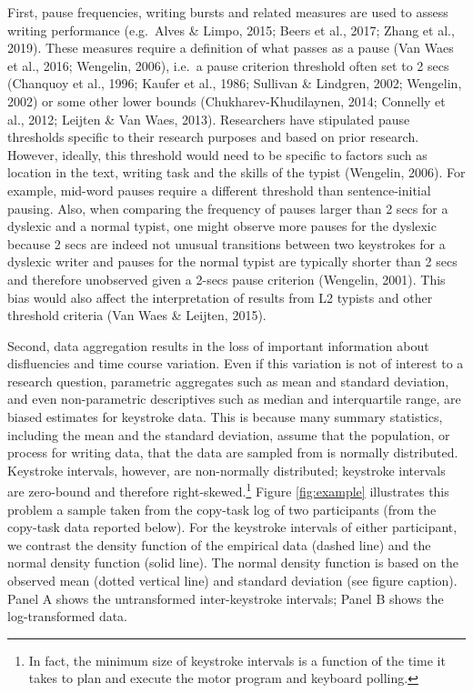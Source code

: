 \documentclass[
  english,
  man,mask,floatsintext]{apa7}
\begin{document}
First, pause frequencies, writing bursts and related measures are used to assess writing performance (e.g.~Alves \& Limpo, 2015; Beers et al., 2017; Zhang et al., 2019). These measures require a definition of what passes as a pause (Van Waes et al., 2016; Wengelin, 2006), i.e.~a pause criterion threshold often set to 2 secs (Chanquoy et al., 1996; Kaufer et al., 1986; Sullivan \& Lindgren, 2002; Wengelin, 2002) or some other lower bounds (Chukharev-Khudilaynen, 2014; Connelly et al., 2012; Leijten \& Van Waes, 2013). Researchers have stipulated pause thresholds specific to their research purposes and based on prior research. However, ideally, this threshold would need to be specific to factors such as location in the text, writing task and the skills of the typist (Wengelin, 2006). For example, mid-word pauses require a different threshold than sentence-initial pausing. Also, when comparing the frequency of pauses larger than 2 secs for a dyslexic and a normal typist, one might observe more pauses for the dyslexic because 2 secs are indeed not unusual transitions between two keystrokes for a dyslexic writer and pauses for the normal typist are typically shorter than 2 secs and therefore unobserved given a 2-secs pause criterion (Wengelin, 2001). This bias would also affect the interpretation of results from L2 typists and other threshold criteria (Van Waes \& Leijten, 2015).

Second, data aggregation results in the loss of important information about disfluencies and time course variation. Even if this variation is not of interest to a research question, parametric aggregates such as mean and standard deviation, and even non-parametric descriptives such as median and interquartile range, are biased estimates for keystroke data. This is because many summary statistics, including the mean and the standard deviation, assume that the population, or process for writing data, that the data are sampled from is normally distributed. Keystroke intervals, however, are non-normally distributed; keystroke intervals are zero-bound and therefore right-skewed.\footnote{In fact, the minimum size of keystroke intervals is a function of the time it takes to plan and execute the motor program and keyboard polling.} Figure \ref{fig:example} illustrates this problem a sample taken from the copy-task log of two participants (from the copy-task data reported below). For the keystroke intervals of either participant, we contrast the density function of the empirical data (dashed line) and the normal density function (solid line). The normal density function is based on the observed mean (dotted vertical line) and standard deviation (see figure caption). Panel A shows the untransformed inter-keystroke intervals; Panel B shows the log-transformed data.
\end{document}
